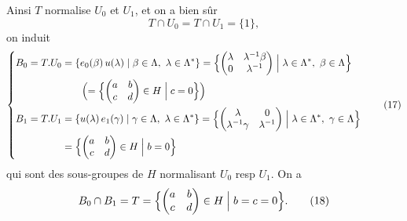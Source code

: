 \documentclass[11pt,a4paper]{article}
\begin{document}
Ainsi $T$ normalise $U_0$ et $U_1$, et on a bien sûr
\[
T \cap U_0 = T \cap U_1 = \{1\}, \tag{16}
\]
on induit
\[
\left\{
\begin{aligned}
B_0 = T . U_0 &= \{ e_0(\beta)\, u(\lambda) \mid \beta \in \Lambda,\ \lambda \in \Lambda^* \}
= \Bigl\{ \begin{pmatrix} \lambda & \lambda^{-1}\beta \\ 0 & \lambda^{-1} \end{pmatrix} \Bigm| \lambda \in \Lambda^*,\ \beta \in \Lambda \Bigr\} \\
&\qquad \Bigl( = \Bigl\{ \begin{pmatrix} a & b \\ c & d \end{pmatrix} \in H \Bigm| c = 0 \Bigr\} \Bigr) \\
B_1 = T . U_1 &= \{ u(\lambda)\, e_1(\gamma) \mid \gamma \in \Lambda,\ \lambda \in \Lambda^* \}
= \Bigl\{ \begin{pmatrix} \lambda & 0 \\ \lambda^{-1}\gamma & \lambda^{-1} \end{pmatrix} \Bigm| \lambda \in \Lambda^*,\ \gamma \in \Lambda \Bigr\} \\
&= \Bigl\{ \begin{pmatrix} a & b \\ c & d \end{pmatrix} \in H \Bigm| b = 0 \Bigr\}
\end{aligned}
\right. \tag{17}
\]
qui sont des sous-groupes de $H$ normalisant $U_0$ resp $U_1$. On a
\[
B_0 \cap B_1 = T = \Bigl\{ \begin{pmatrix} a & b \\ c & d \end{pmatrix} \in H \Bigm| b = c = 0 \Bigr\} . \tag{18}
\]
\end{document}
